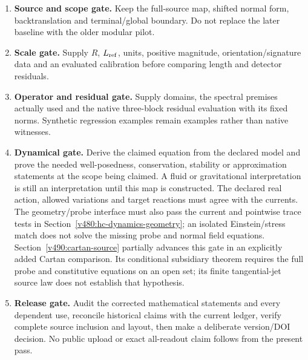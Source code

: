 \begin{enumerate}[leftmargin=*]
\item \textbf{Source and scope gate.} Keep the full-source map,
shifted normal form, backtranslation and terminal/global boundary.
Do not replace the later baseline with the older modular pilot.
\item \textbf{Scale gate.} Supply $R$, $L_{\rm ref}$, units,
positive magnitude, orientation/signature data and an evaluated
calibration before comparing length and detector residuals.
\item \textbf{Operator and residual gate.} Supply domains,
the spectral premises actually used and the native three-block
residual evaluation with its fixed norms. Synthetic regression
examples remain examples rather than native witnesses.
\item \textbf{Dynamical gate.} Derive the claimed equation from
the declared model and prove the needed well-posedness,
conservation, stability or approximation statements at the scope
being claimed. A fluid or gravitational interpretation is still
an interpretation until this map is constructed.
The declared real action, allowed variations and target reactions must
agree with the currents. The geometry/probe interface must also pass
the current and pointwise trace tests in
Section~\ref{v480:hc-dynamics-geometry}; an isolated Einstein/stress
match does not solve the missing probe and normal field equations.
Section~\ref{v490:cartan-source} partially advances this gate in an
explicitly added Cartan comparison. Its conditional subsidiary theorem
requires the full probe and constitutive equations on an open set;
its finite tangential-jet source law does not establish that hypothesis.
\item \textbf{Release gate.} Audit the corrected mathematical
statements and every dependent use, reconcile historical claims
with the current ledger, verify complete source inclusion and
layout, then make a deliberate version/DOI decision. No public
upload or exact all-readout claim follows from the present pass.
\end{enumerate}
